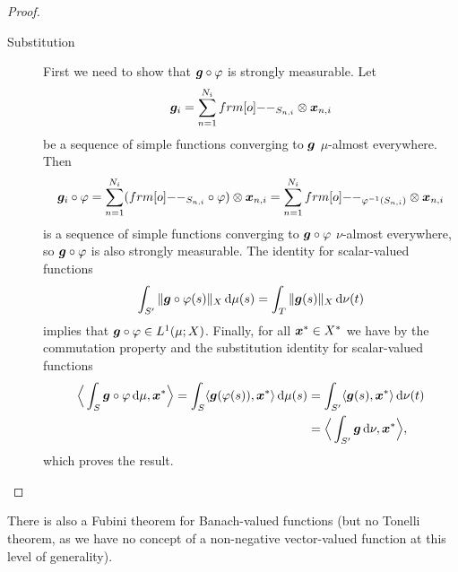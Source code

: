 \begin{proof}
\begin{description}
  \item[Substitution]
    First we need to show that $\bm{g} \circ \varphi$ is strongly measurable.
    Let
    \begin{equation*}
      \mb{g}_i = \sum_{n=1}^{N_i} \1_{S_{n,i}} \otimes \mb{x}_{n,i}
    \end{equation*}
    be a sequence of simple functions converging to $\bm{g}$ $\mu$-almost everywhere.
    Then
    \begin{equation*}
      \mb{g}_i \circ \phi = \sum_{n=1}^{N_i} (\1_{S_{n,i}} \circ \phi) \otimes \mb{x}_{n,i} = \sum_{n=1}^{N_i} \1_{\phi^{-1}(S_{n,i})} \otimes \mb{x}_{n,i}
    \end{equation*}
    is a sequence of simple functions converging to $\bm{g} \circ \varphi$ $\nu$-almost everywhere, so $\bm{g} \circ \varphi$ is also strongly measurable.
    The identity for scalar-valued functions
    \begin{equation*}
      \int_{S'} \|\bm{g} \circ \varphi(s)\|_X \, \mathrm{d}\mu(s) = \int_T \|\bm{g}(s)\|_X \, \mathrm{d}\nu(t)
    \end{equation*}
    implies that $\bm{g} \circ \varphi \in L^1(\mu;X)$.
    Finally, for all $\bm{x}^* \in X^*$ we have by the commutation property and the substitution identity for scalar-valued functions
    \begin{equation*}
      \begin{aligned}
        \Big\langle \int_S \bm{g} \circ \varphi \, \mathrm{d}\mu , \bm{x}^* \Big\rangle
        = \int_S \langle \bm{g}(\varphi(s)), \bm{x}^* \rangle \, \mathrm{d}\mu(s)
        &= \int_{S'} \langle \bm{g}(s), \bm{x}^* \rangle \, \mathrm{d}\nu(t) \\
        &= \Big\langle \int_{S'} \bm{g} \, \mathrm{d}\nu, \bm{x}^* \Big\rangle,
      \end{aligned}
    \end{equation*}
    which proves the result.
  \end{description}
\end{proof}

There is also a Fubini theorem for Banach-valued functions (but no Tonelli theorem, as we have no concept of a non-negative vector-valued function at this level of generality).

